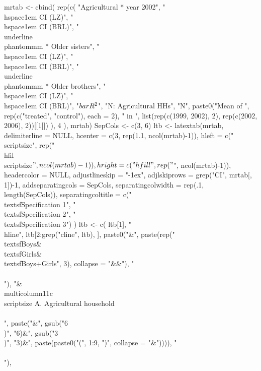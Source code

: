 \begin{Schunk}
\begin{Sinput}
mrtab <- 
  cbind(
      rep(c(
        "Agricultural * year 2002", 
        "\\hspace{1em} CI (LZ)", "\\hspace{1em} CI (BRL)", 
        "\\underline{\\phantom{mm}} * Older sisters",
        "\\hspace{1em} CI (LZ)", "\\hspace{1em} CI (BRL)", 
        "\\underline{\\phantom{mm}} * Older brothers",
        "\\hspace{1em} CI (LZ)", "\\hspace{1em} CI (BRL)", 
        "$\\bar{R}^{2}$", "N: Agricultural HHs", "N",
        paste0("Mean of ", rep(c("treated", "control"), each = 2), " in ", 
          list(rep(c(1999, 2002), 2), rep(c(2002, 2006), 2))[[1]])
         ), 4
      ), 
   mrtab)
SepCols <- c(3, 6)
ltb <- latextab(mrtab, delimiterline = NULL, 
    hcenter = c(3, rep(1.1, ncol(mrtab)-1)),
    hleft = c("\\scriptsize", rep("\\hfil\\scriptsize$", ncol(mrtab)-1)), 
    hright = c("\\hfill", rep("$", ncol(mrtab)-1)),
    headercolor = NULL, 
    adjustlineskip = "-1ex", adjlskiprows = grep("CI", mrtab[, 1])-1,
    addseparatingcols = SepCols, separatingcolwidth = rep(.1, length(SepCols)), 
    separatingcoltitle = c("\\textsf{Specification 1}", "\\textsf{Specification 2}", "\\textsf{Specification 3}")
  ) 
ltb <- c(
  ltb[1], 
  "\\hline", 
  ltb[2:grep("cline", ltb), ],
  paste0("&", paste(rep("\\textsf{Boys}&\\textsf{Girls}&\\textsf{Boys+Girls}", 3), collapse = "&&"), "\\\\"),
  "&\\multicolumn{11}{c}{\\scriptsize A. Agricultural household}\\\\",
  paste("&",
    gsub("6\\)", "6)&", gsub("3\\)", "3)&", paste(paste0("(", 1:9, ")", collapse = "&")))), "\\\\"),

\end{Sinput}
\end{Schunk}
